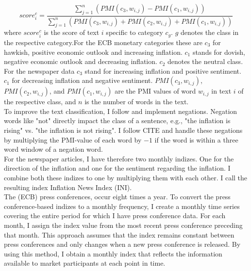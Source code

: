\documentclass[review]{elsarticle}
\begin{document}
\begin{equation}
score_i^c = \frac{\sum_{j=1}^n (PMI(c_3, w_{i,j}) - PMI(c_1,w_{i,j}))}{\sum_{j=1}^n (PMI(c_3, w_{i,j}) + PMI(c_2, w_{i,j}) + PMI(c_1, w_{i,j}))}
\end{equation}
where $score_i^c$ is the score of text $i$ specific to category $c_g$. $g$ denotes the class in the respective category.For the ECB monetary categories these are $c_3$ for hawkish, positive economic outlook and increasing inflation. $c_1$ stands for dovish, negative economic outlook and decreasing inflation. $c_2$ denotes the neutral class. For the newspaper data $c_3$ stand for increasing inflation and positive sentiment. $c_1$ for decreasing inflation and negative sentiment. $PMI(c_3, w_{i,j})$, $PMI(c_2, w_{i,j})$, and $PMI(c_1, w_{i,j})$ are the PMI values of word $w_{i,j}$ in text $i$ of the respective class, and $n$ is the number of words in the text. 
\\
To improve the text classification, I follow \cite{Shapiro2022} and implement negations. Negation words like "not" directly impact the class of a sentence, e.g., "the inflation is rising" vs. "the inflation is not rising". I follow CITE and handle these negations by multiplying the PMI-value of each word by $-1$ if the word is within a three word window of a negation word. 
\\
For the newspaper articles, I have therefore two monthly indizes. One for the direction of the inflation and one for the sentiment regarding the inflation. I combine both these indizes to one by multiplying them with each other. I call the resulting index Inflation News Index (INI). 
\\
The (ECB) press conferences, occur eight times a year. To convert the press conference-based indizes to a monthly frequency, I create a monthly time series covering the entire period for which I have press conference data. For each month, I assign the index value from the most recent press conference preceding that month. This approach assumes that the index remains constant between press conferences and only changes when a new press conference is released. By using this method, I obtain a monthly index that reflects the information available to market participants at each point in time. 
\end{document}
